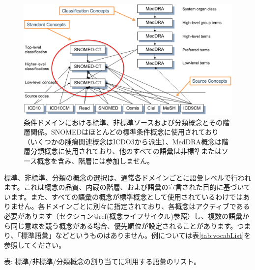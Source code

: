 \documentclass[
  11pt]{book}
\theoremstyle{definition}
\theoremstyle{definition}
\theoremstyle{definition}
\theoremstyle{definition}
\theoremstyle{remark}
\begin{document}
\begin{figure}

{\centering \includegraphics[width=1\linewidth]{images/StandardizedVocabularies/hierarchy} 

}

\caption{条件ドメインにおける標準、非標準ソースおよび分類概念とその階層関係。SNOMEDはほとんどの標準条件概念に使用されており（いくつかの腫瘍関連概念はICDO3から派生）、MedDRA概念は階層分類概念に使用されており、他のすべての語彙は非標準またはソース概念を含み、階層には参加しません。}\label{fig:hierarchy}
\end{figure}

標準、非標準、分類の概念の選択は、通常各ドメインごとに語彙レベルで行われます。これは概念の品質、内蔵の階層、および語彙の宣言された目的に基づいています。また、すべての語彙の概念が標準概念として使用されているわけではありません。各ドメインごとに別々に指定されており、各概念はアクティブである必要があります（セクション@ref(概念ライフサイクル)参照）し、複数の語彙から同じ意味を競う概念がある場合、優先順位が設定されることがあります。つまり、「標準語彙」などというものはありません。例については表\ref{tab:vocabList}を参照してください。

表: \label{tab:vocabList} 標準/非標準/分類概念の割り当てに利用する語彙のリスト。
\end{document}
